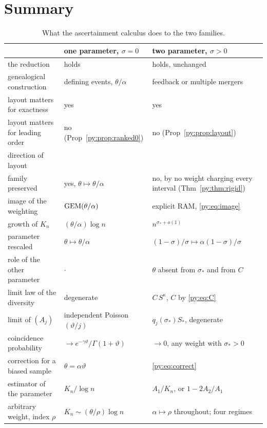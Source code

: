 \section{Summary}
\label{py:sec:summary}

\begin{table}[t]
\centering
\caption{What the ascertainment calculus does to the two families.}
\label{py:tab:summary}
\begin{tabularx}{\textwidth}{>{\raggedright\arraybackslash}p{1.35in}>{\raggedright\arraybackslash}X>{\raggedright\arraybackslash}X}
\toprule
& one parameter, $\sigma = 0$ & two parameter, $\sigma > 0$ \\
\midrule
the reduction & holds & holds, unchanged \\
genealogical construction & defining events, $\theta/\alpha$ & feedback or multiple mergers \\
layout matters for exactness & yes & yes \\
layout matters for leading order & no (Prop~\ref{py:prop:ranked0}) & no (Prop~\ref{py:prop:layout}) \\
direction of layout & \multicolumn{2}{l}{absorbed into $G$ (Lemma~\ref{py:lem:reflect})} \\
family preserved & yes, $\theta \mapsto \theta/\alpha$ & no, by no weight charging every interval
  (Thm~\ref{py:thm:rigid}) \\
image of the weighting & $\mathrm{GEM}(\theta/\alpha)$ & explicit RAM, \eqref{py:eq:image} \\
growth of $K_n$ & $(\theta/\alpha)\log n$ & $n^{\sigma_*+o(1)}$ \\
parameter rescaled & $\theta \mapsto \theta/\alpha$ &
  $(1-\sigma)/\sigma \mapsto \alpha(1-\sigma)/\sigma$ \\
role of the other parameter & $\cdot$ & $\theta$ absent from $\sigma_*$ and from $C$ \\
limit law of the diversity & degenerate & $C\,S^{\kappa}$, $C$ by \eqref{py:eq:C} \\
limit of $(A_j)$ & independent Poisson$(\vartheta/j)$ & $q_j(\sigma_*)S_*$, degenerate \\
coincidence probability & $\to e^{-\gamma\vartheta}/\Gamma(1+\vartheta)$ & $\to 0$, any weight with $\sigma_* > 0$ \\
correction for a biased sample & $\theta = \alpha\vartheta$ & \eqref{py:eq:correct} \\
estimator of the parameter & $K_n/\log n$ & $A_1/K_n$, or $1-2A_2/A_1$ \\
arbitrary weight, index $\rho$ & $K_n \sim (\theta/\rho)\log n$ &
  $\alpha \mapsto \rho$ throughout; four regimes \\
\bottomrule
\end{tabularx}
\end{table}

